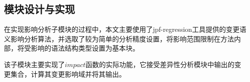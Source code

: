 %


%
%

\subsection{模块设计与实现}
\label {tool_impacter}

在实现影响分析子模块的过程中，本文主要使用了jpf-regression工具提供的变更语义影响分析算法，并选取了较为简单的分析精度设置，将影响范围限制在方法内部，将受影响的语法结构类型设置为基本块。

该子模块主要实现了$impact$函数的实际功能，它接受差异性分析模块中输出的变更集合，计算其变更影响域并将其输出。


